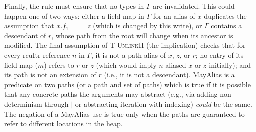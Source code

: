 Finally, the rule must ensure that no types in $\Gamma$ are invalidated.  This could happen one of two ways: either a field map in $\Gamma$ for an alias of $x$ duplicates the assumption that $x.f_1==z$ (which is changed by this write), or $\Gamma$ contains a descendant of $r$, whose path from the root will change when its ancestor is modified.
The final assumption of \textsc{T-UnlinkH} (the implication)
checks that for every \textsf{rcuItr} reference $n$ in $\Gamma$, it is not a path alias of $x$, $z$, or $r$; no entry of its field map ($m$) refers to $r$ or $z$ (which would imply $n$ aliased $x$ or $z$ initially); and its path is not an extension of $r$ (i.e., it is not a descendant).
\textsf{MayAlias} is a predicate on two paths (or a path and set of paths) which is true if it is possible that any concrete paths the arguments may abstract (e.g., via adding non-determinism through $|$ or abstracting iteration with indexing) \emph{could} be the same.  The negation of a \textsf{MayAlias} use is true only when the paths are guaranteed to refer to different locations in the heap.
